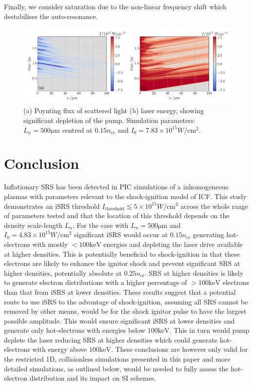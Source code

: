 Finally, we consider saturation due to the non-linear frequency shift which destabilises the auto-resonance.

\begin{figure}[h]
   \centering
    \includegraphics[width=\columnwidth]{Chapters/C4_iSRS/783e15_pump_depletion.pdf}
    \caption{(a) Poynting flux of scattered light (b) laser energy, showing significant depletion of the pump. Simulation parameters: $L_n = 500 \si{\micro\metre} $ centred at $0.15n_\mathrm{cr}$
    and $I_0 = 7.83\times10^{15} \si{W/\centi\metre^2}$. }
    \label{fig:pumpdepletion}
\end{figure}{}


\section{Conclusion}\label{sec:conclusion}
Inflationary SRS has been detected in PIC simulations of a inhomogeneous plasmas
with parameters relevant to the shock-ignition model of ICF.
This study demonstrates an iSRS threshold
 $I_\mathrm{threshold} \lesssim 5\times 10^{15} \si{W/\centi\metre^2}$ across the whole range of parameters tested
 and that the location of this threshold depends on the density scale-length $L_n$. For the case with
$L_n=500 \si{\micro\metre}$ and $I_0 =4.83\times10^{15} \si{W/\centi\metre^2}$ significant iSRS  would occur
at $0.15 n_{\mathrm{cr}}$ generating hot-electrons with mostly $< 100 \si{\kilo \electronvolt}$ energies and
depleting the laser drive available at higher densities. This is potentially beneficial to
shock-ignition in that these electrons are likely to enhance the ignitor shock and prevent significant SRS at higher densities,
potentially absolute at $0.25 n_\mathrm{cr}$. SRS at higher densities is likely to
generate electron distributions with a higher percentage of
$> 100 \si{\kilo \electronvolt}$ electrons than that from iSRS at lower densities.
These results suggest that a potential route to use iSRS to the advantage of shock-ignition,
assuming all SRS cannot be removed by other means,
would be for the shock ignitor pulse to have the largest possible amplitude. This would ensure significant iSRS at lower
densities and generate only hot-electrons with energies below $100 \si{\kilo \electronvolt}$. This in turn would pump deplete the laser
reducing SRS at higher densities which could generate hot-electrons with energy above  $100 \si{\kilo \electronvolt}$. These conclusions are however only valid for the restricted 1D, collisionless simulations
presented in this paper and more detailed simulations, as outlined below, would be needed to fully assess the hot-electron
distribution and its impact on SI schemes.

